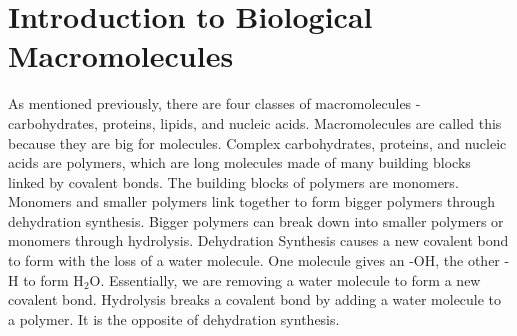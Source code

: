 \documentclass[../bio.tex]{subfiles}
\begin{document}
\section{Introduction to Biological Macromolecules}
As mentioned previously, there are four classes of macromolecules - carbohydrates, proteins, lipids, and nucleic acids. Macromolecules are called this because they are big for molecules.
\smallbreak
Complex carbohydrates, proteins, and nucleic acids are polymers, which are long molecules made of many building blocks linked by covalent bonds. The building blocks of polymers are monomers.
\smallbreak
Monomers and smaller polymers link together to form bigger polymers through dehydration synthesis. Bigger polymers can break down into smaller polymers or monomers through hydrolysis. 
\smallbreak
Dehydration Synthesis causes a new covalent bond to form with the loss of a water molecule. One molecule gives an -OH, the other -H to form H$_2$O. Essentially, we are removing a water molecule to form a new covalent bond.
\smallbreak
Hydrolysis breaks a covalent bond by adding a water molecule to a polymer. It is the opposite of dehydration synthesis.
\end{document}
